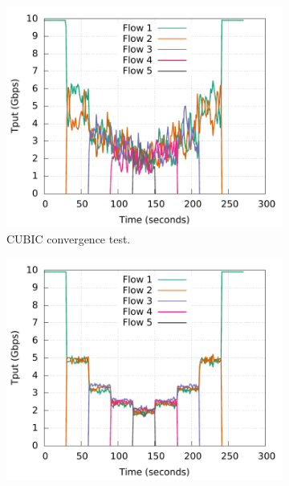 \begin{figure}[!t]
        \centering
        \begin{subfigure}[b]{0.3\textwidth}
                \centering
                \includegraphics[width=\textwidth]{acdctcp/figures/convergence/flowcontrolOFF/tcp_flowcontrolOFF_convergence.pdf}
                \caption{CUBIC convergence test.}
                \label{cubic_convergence}
        \end{subfigure}
        \begin{subfigure}[b]{0.3\textwidth}
                \centering
                \includegraphics[width=\textwidth]{acdctcp/figures/convergence/flowcontrolOFF/dctcp_flowcontrolOFF_convergence.pdf}

\end{subfigure}
\end{figure}
